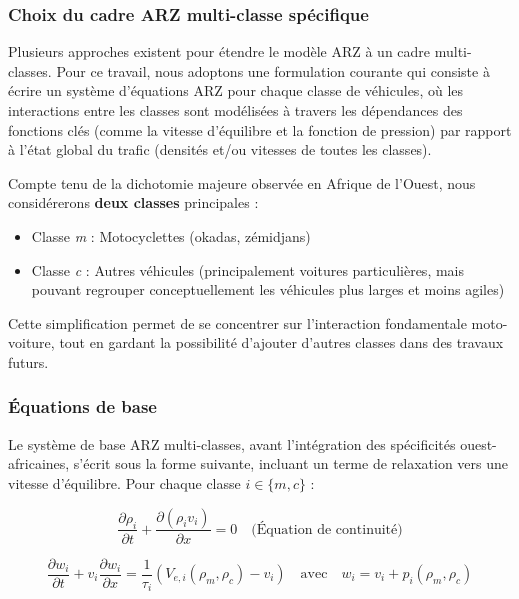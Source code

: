 \subsubsection{Choix du cadre ARZ multi-classe spécifique}
Plusieurs approches existent pour étendre le modèle ARZ à un cadre multi-classes. Pour ce travail, nous adoptons une formulation courante qui consiste à écrire un système d'équations ARZ pour chaque classe de véhicules, où les interactions entre les classes sont modélisées à travers les dépendances des fonctions clés (comme la vitesse d'équilibre et la fonction de pression) par rapport à l'état global du trafic (densités et/ou vitesses de toutes les classes).

Compte tenu de la dichotomie majeure observée en Afrique de l'Ouest, nous considérerons \textbf{deux classes} principales :
\begin{itemize}
    \item Classe \textit{m} : Motocyclettes (okadas, zémidjans)
    \item Classe \textit{c} : Autres véhicules (principalement voitures particulières, mais pouvant regrouper conceptuellement les véhicules plus larges et moins agiles)
\end{itemize}

Cette simplification permet de se concentrer sur l'interaction fondamentale moto-voiture, tout en gardant la possibilité d'ajouter d'autres classes dans des travaux futurs.

\subsubsection{Équations de base}
Le système de base ARZ multi-classes, avant l'intégration des spécificités ouest-africaines, s'écrit sous la forme suivante, incluant un terme de relaxation vers une vitesse d'équilibre. Pour chaque classe $ i \in \{m, c\} $ :

\begin{equation}
    \frac{\partial \rho_i}{\partial t} + \frac{\partial (\rho_i v_i)}{\partial x} = 0 \quad \text{(Équation de continuité)}
\end{equation}

\begin{equation}
    \frac{\partial w_i}{\partial t} + v_i \frac{\partial w_i}{\partial x} = \frac{1}{\tau_i} (V_{e,i}(\rho_m, \rho_c) - v_i) \quad \text{avec} \quad w_i = v_i + p_i(\rho_m, \rho_c)
\end{equation}

